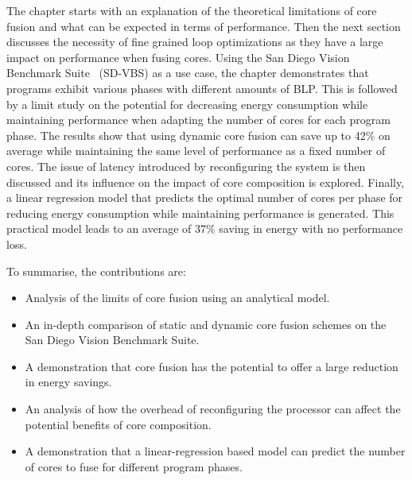 The chapter starts with an explanation of the theoretical limitations of core fusion and what can be expected in terms of performance.
Then the next section discusses the necessity of fine grained loop optimizations as they have a large impact on performance when fusing cores.
Using the San Diego Vision Benchmark Suite~\cite{sdvbs} (SD-VBS) as a use case, the chapter demonstrates that programs exhibit various phases with different amounts of BLP.
This is followed by a limit study on the potential for decreasing energy consumption while maintaining performance when adapting the number of cores for each program phase.
The results show that using dynamic core fusion can save up to 42\% on average while maintaining the same level of performance as a fixed number of cores.
The issue of latency introduced by reconfiguring the system is then discussed and its influence on the impact of core composition is explored.
Finally, a linear regression model that predicts the optimal number of cores per phase for reducing energy consumption while maintaining performance is generated.
This practical model leads to an average of 37\% saving in energy with no performance loss.

To summarise, the contributions are:

\begin{itemize}
\item Analysis of the limits of core fusion using an analytical model.
\vspace{-1em}
\item An in-depth comparison of static and dynamic core fusion schemes on the San Diego Vision Benchmark Suite.
\vspace{-1em}
\item A demonstration that core fusion has the potential to offer a large reduction in energy savings.
\vspace{-1em}
\item An analysis of how the overhead of reconfiguring the processor can affect the potential benefits of core composition.
\vspace{-1em}
\item A demonstration that a linear-regression based model can predict the number of cores to fuse for different program phases.
\end{itemize}
